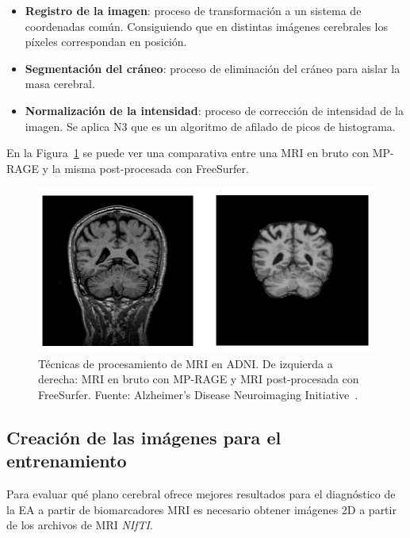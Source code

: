 \begin{itemize}
    \item \textbf{Registro de la imagen}: proceso de transformación a un sistema de coordenadas común.
    Consiguiendo que en distintas imágenes cerebrales los píxeles correspondan en posición.
    \item \textbf{Segmentación del cráneo}: proceso de eliminación del cráneo para aislar la masa cerebral.
    \item \textbf{Normalización de la intensidad}: proceso de corrección de intensidad de la imagen.
    Se aplica N3 que es un algoritmo de afilado de picos de histograma. \\
\end{itemize}

En la Figura~\ref{fig:adni-mri} se puede ver una comparativa entre una MRI en bruto con MP-RAGE y la misma post-procesada con
FreeSurfer.

\begin{figure}[H]
    \centering
    \includegraphics[width=\textwidth]{./imgs/adni-mri}
    \caption{Técnicas de procesamiento de MRI en ADNI. De izquierda a derecha: MRI en bruto con MP-RAGE y MRI
    post-procesada con FreeSurfer. Fuente: Alzheimer’s Disease Neuroimaging Initiative~\cite{img-adni-mri}. }
    \label{fig:adni-mri}
\end{figure}

\subsection{Creación de las imágenes para el entrenamiento}\label{subsec:creacion-de-las-imagenes-para-el-entrenamiento}
Para evaluar qué plano cerebral ofrece mejores resultados para el diagnóstico de la EA a partir de biomarcadores MRI es
necesario obtener imágenes 2D a partir de los archivos de MRI \textit{NIfTI}.

